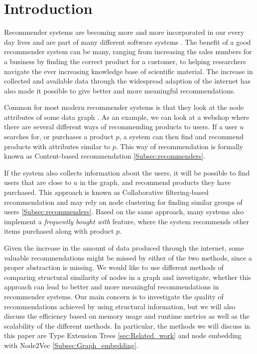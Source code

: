 \section{Introduction}
  Recommender systems are becoming more and more incorporated in our every day lives and are part of many different software systems \cite{recommender_e-comerce}. The benefit of a good recommender system can be many,  ranging from increasing the sales numbers for a business by finding the correct product for a customer, to helping researchers navigate the ever increasing knowledge base of scientific material. The increase in collected and available data through the widespread adaption of the internet has also made it possible to give better and more meaningful recommendations.

  Common for most modern recommender systems is that they look at the node attributes of some data graph \cite{Ricci2015}. As an example, we can look at a webshop where there are several different ways of recommending products to users. If a user $u$ searches for, or purchases a product $p$, a system can then find and recommend products with attributes similar to $p$. This way of recommendation is formally known as Content-based recommendation \ref{Subsec:recommenders}.

  If the system also collects information about the users, it will be possible to find users that are close to $u$ in the graph, and recommend products they have purchased. This approach is known as Collaborative filtering-based recommendation and may rely on node clustering for finding similar groups of users \ref{Subsec:recommenders}. Based on the same approach, many systems also implement a \textit{frequently bought with} feature, where the system recommends other items purchased along with product $p$.

  Given the increase in the amount of data produced through the internet, some valuable recommendations might be missed by either of the two methods, since a proper abstraction is missing. We would like to use different methods of comparing structural similarity of nodes in a graph and investigate, whether this approach can lead to better and more meaningful recommendations in recommender systems. Our main concern is to investigate the quality of recommendations achieved by using structural information, but we will also discuss the efficiency based on memory usage and runtime metrics as well as the scalability of the different methods. In particular, the methods we will discuss in this paper are Type Extension Trees \ref{sec:Related_work} and node embedding with Node2Vec \ref{Subsec:Graph_embedding}.

